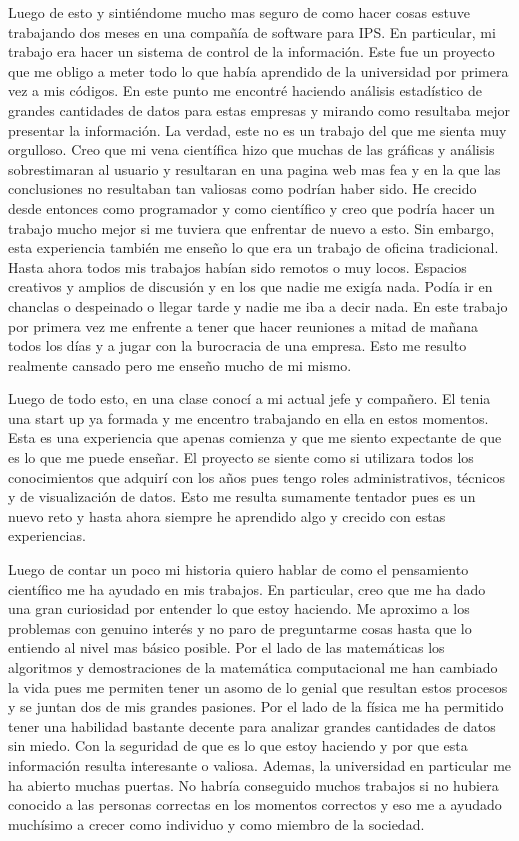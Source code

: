 \documentclass[12pt]{exam}
\begin{document}
Luego de esto y sintiéndome mucho mas seguro de como hacer cosas estuve trabajando dos meses en una compañía de software para IPS. En particular, mi trabajo era hacer un sistema de control de la información. Este fue un proyecto que me obligo a meter todo lo que había aprendido de la universidad por primera vez a mis códigos. En este punto me encontré haciendo análisis estadístico de grandes cantidades de datos para estas empresas y mirando como resultaba mejor presentar la información. La verdad, este no es un trabajo del que me sienta muy orgulloso. Creo que mi vena científica hizo que muchas de las gráficas y análisis sobrestimaran al usuario y resultaran en una pagina web mas fea y en la que las conclusiones no resultaban tan valiosas como podrían haber sido. He crecido desde entonces como programador y como científico y creo que podría hacer un trabajo mucho mejor si me tuviera que enfrentar de nuevo a esto. Sin embargo, esta experiencia también me enseño lo que era un trabajo de oficina tradicional. Hasta ahora todos mis trabajos habían sido remotos o muy locos. Espacios creativos y amplios de discusión y en los que nadie me exigía nada. Podía ir en chanclas o despeinado o llegar tarde y nadie me iba a decir nada. En este trabajo por primera vez me enfrente a tener que hacer reuniones a mitad de mañana todos los días y a jugar con la burocracia de una empresa. Esto me resulto realmente cansado pero me enseño mucho de mi mismo.

Luego de todo esto, en una clase conocí a mi actual jefe y compañero. El tenia una start up ya formada y me encentro trabajando en ella en estos momentos. Esta es una experiencia que apenas comienza y que me siento expectante de que es lo que me puede enseñar. El proyecto se siente como si utilizara todos los conocimientos que adquirí con los años pues tengo roles administrativos, técnicos y de visualización de datos. Esto me resulta sumamente tentador pues es un nuevo reto y hasta ahora siempre he aprendido algo y crecido con estas experiencias.

Luego de contar un poco mi historia quiero hablar de como el pensamiento científico me ha ayudado en mis trabajos. En particular, creo que me ha dado una gran curiosidad por entender lo que estoy haciendo. Me aproximo a los problemas con genuino interés y no paro de preguntarme cosas hasta que lo entiendo al nivel mas básico posible. Por el lado de las matemáticas los algoritmos y demostraciones de la matemática computacional me han cambiado la vida pues me permiten tener un asomo de lo genial que resultan estos procesos y se juntan dos de mis grandes pasiones. Por el lado de la física me ha permitido tener una habilidad bastante decente para analizar grandes cantidades de datos sin miedo. Con la seguridad de que es lo que estoy haciendo y por que esta información resulta interesante o valiosa. Ademas, la universidad en particular me ha abierto muchas puertas. No habría conseguido muchos trabajos si no hubiera conocido a las personas correctas en los momentos correctos y eso me a ayudado muchísimo a crecer como individuo y como miembro de la sociedad.
\end{document}
